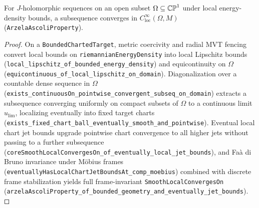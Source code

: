 \begin{theorem}
\label{cert_aa}
\leanok
{}
For $J$-holomorphic sequences on an open subset $\Omega\subseteq\mathbb{CP}^1$ under local energy-density bounds,
a subsequence converges in $C^\infty_{\mathrm{loc}}(\Omega,M)$ (\texttt{ArzelaAscoliProperty}).
\end{theorem}
\begin{proof}\leanok On a \texttt{BoundedChartedTarget}, metric coercivity and radial MVT fencing convert
local bounds on \texttt{riemannianEnergyDensity} into local Lipschitz bounds
(\texttt{local\_lipschitz\_of\_bounded\_energy\_density}) and equicontinuity on $\Omega$
(\texttt{equicontinuous\_of\_local\_lipschitz\_on\_domain}). Diagonalization over a countable dense sequence
in $\Omega$ (\texttt{exists\_continuousOn\_pointwise\_convergent\_subseq\_on\_domain}) extracts a subsequence
converging uniformly on compact subsets of $\Omega$ to a continuous limit $u_{\mathrm{lim}}$, localizing
eventually into fixed target charts (\texttt{exists\_fixed\_chart\_ball\_eventually\_smooth\_and\_pointwise}).
Eventual local chart jet bounds upgrade pointwise chart convergence to all higher jets without passing to a
further subsequence (\texttt{coreSmoothLocalConvergesOn\_of\_eventually\_local\_jet\_bounds}), and
Fa\`a di Bruno invariance under M\"obius frames (\texttt{eventuallyHasLocalChartJetBoundsAt\_comp\_moebius})
combined with discrete frame stabilization yields full frame-invariant \texttt{SmoothLocalConvergesOn}
(\texttt{arzelaAscoliProperty\_of\_bounded\_geometry\_and\_eventually\_jet\_bounds}).\end{proof}

